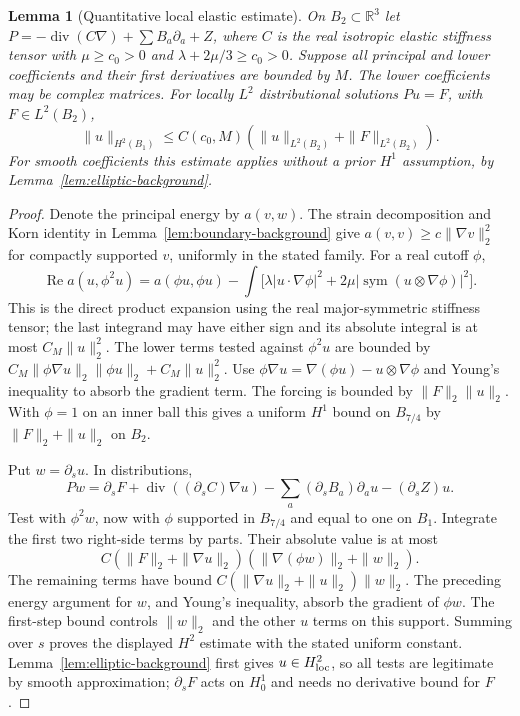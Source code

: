 \documentclass[11pt]{article}
\newcommand{\R}{\mathbb R}
\newtheorem{lemma}[theorem]{Lemma}
\theoremstyle{remark}
\numberwithin{equation}{section}
\begin{document}
\begin{lemma}[Quantitative local elastic estimate]
\label{lem:local-elastic-estimate}
On $B_2\subset\R^3$ let
$P=-\operatorname{div}(C\nabla)+\sum B_a\partial_a+Z$, where $C$ is
the real isotropic elastic stiffness tensor with
$\mu\ge c_0>0$ and $\lambda+2\mu/3\ge c_0>0$.
Suppose all principal and lower coefficients and their first derivatives
are bounded by $M$. The lower coefficients may be complex matrices.
For locally $L^2$ distributional solutions $Pu=F$, with $F\in L^2(B_2)$,
\[
 \|u\|_{H^2(B_1)}\le C(c_0,M)(\|u\|_{L^2(B_2)}+\|F\|_{L^2(B_2)}).
\]
For smooth coefficients this estimate applies without a prior $H^1$
assumption, by Lemma~\ref{lem:elliptic-background}.
\end{lemma}
\begin{proof}
Denote the principal energy by $a(v,w)$. The strain decomposition and
Korn identity in Lemma~\ref{lem:boundary-background} give
$a(v,v)\ge c\|\nabla v\|_2^2$ for compactly supported $v$, uniformly
in the stated family. For a real cutoff $\phi$,
\[
 \operatorname{Re}a(u,\phi^2u)
 =a(\phi u,\phi u)
 -\int\bigl[\lambda|u\cdot\nabla\phi|^2
       +2\mu|\operatorname{sym}(u\otimes\nabla\phi)|^2\bigr].
\]
This is the direct product expansion using the real major-symmetric
stiffness tensor; the last integrand may have either sign and its absolute
integral is at most $C_M\|u\|_2^2$. The lower terms tested against
$\phi^2u$ are bounded by
$C_M\|\phi\nabla u\|_2\|\phi u\|_2+C_M\|u\|_2^2$.
Use $\phi\nabla u=\nabla(\phi u)-u\otimes\nabla\phi$ and Young's
inequality to absorb the gradient term. The forcing is bounded by
$\|F\|_2\|u\|_2$. With $\phi=1$ on an inner ball this gives a uniform
$H^1$ bound on $B_{7/4}$ by $\|F\|_2+\|u\|_2$ on $B_2$.

Put $w=\partial_su$. In distributions,
\[
 Pw=\partial_sF+\operatorname{div}((\partial_sC)\nabla u)
       -\sum_a(\partial_sB_a)\partial_au-(\partial_sZ)u.
\]
Test with $\phi^2w$, now with $\phi$ supported in $B_{7/4}$ and equal
to one on $B_1$. Integrate the first two right-side terms by parts.
Their absolute value is at most
\[
 C(\|F\|_2+\|\nabla u\|_2)
    (\|\nabla(\phi w)\|_2+\|w\|_2).
\]
The remaining terms have bound
$C(\|\nabla u\|_2+\|u\|_2)\|w\|_2$. The preceding energy argument
for $w$, and Young's inequality, absorb the gradient of $\phi w$.
The first-step bound controls $\|w\|_2$ and the other $u$ terms on this
support. Summing over $s$ proves the displayed $H^2$ estimate with the
stated uniform constant. Lemma~\ref{lem:elliptic-background} first gives
$u\in H^2_{\rm loc}$, so all tests are legitimate by smooth approximation;
$\partial_sF$ acts on $H^1_0$ and needs no derivative bound for $F$.
\end{proof}
\end{document}
